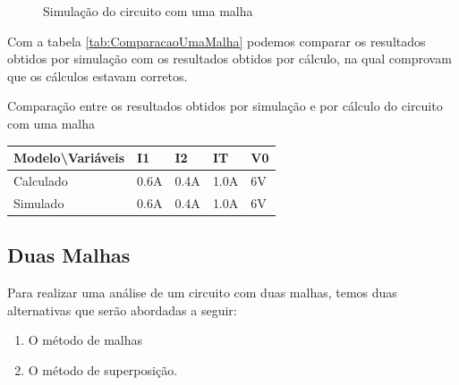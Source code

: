 \begin{figure}[H]
    \centering
    \caption{Simulação do circuito com uma malha}
    \vspace{-0.3cm}
    \label{fig:SimulacaoUmaMalha}
\end{figure}

Com a tabela \ref{tab:ComparacaoUmaMalha} podemos comparar os resultados obtidos por simulação com os resultados obtidos por cálculo, na qual comprovam que os cálculos estavam corretos.

\begin{quadro}[H]
    \centering
    \caption{Comparação entre os resultados obtidos por simulação e por cálculo do circuito com uma malha}
    \begin{tabular}{|C{0.35\textwidth}|C{0.14\textwidth}|C{0.14\textwidth}|C{0.14\textwidth}|C{0.14\textwidth}|}
        \hline
        \textbf{Modelo\textbackslash{}Variáveis} & \textbf{I1} & \textbf{I2} & \textbf{IT} & \textbf{V0} \\
        \hline
        Calculado & 0.6A & 0.4A & 1.0A & 6V \\
        \hline
        Simulado & 0.6A & 0.4A & 1.0A & 6V \\
        \hline
    \end{tabular}
    \vspace{-0.6cm}
    \label{tab:ComparacaoUmaMalha}
\end{quadro}

\subsection{Duas Malhas}

Para realizar uma análise de um circuito com duas malhas, temos duas alternativas que serão abordadas a seguir:

\begin{enumerate}
    \item O método de malhas
    \item O método de superposição.
\end{enumerate}

